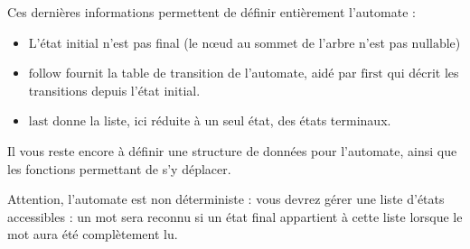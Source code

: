 \documentclass{article}
\begin{document}
Ces dernières informations permettent de définir entièrement l'automate : 
\begin{itemize}
\item L'état initial n'est pas final (le n\oe ud au sommet de l'arbre n'est pas $\mbox{nullable}$)
\item $\mbox{follow}$ fournit la table de transition de l'automate, aidé par $\mbox{first}$ qui décrit les transitions depuis l'état initial. 
\item $\mbox{last}$ donne la liste, ici réduite à un seul état, des états terminaux. 
\end{itemize}


Il vous reste encore à définir une structure de données pour l'automate, ainsi que les fonctions permettant de s'y déplacer. 

Attention, l'automate est non déterministe  : vous devrez gérer une liste d'états accessibles : un mot sera reconnu si un état final appartient à cette liste lorsque le mot aura été complètement lu. 
\end{document}
